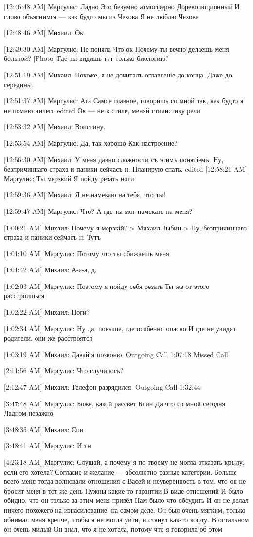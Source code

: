 \documentclass{article}
\newcommand{\yat}{{\fontencoding{X2}\selectfont\cyryat}} %
\begin{document}
{[12:46:48 AM] Маргулис:
Ладно
 Это безумно атмосферно
 Дореволюционный
 И слово объяснимся — как будто мы из Чехова
 Я не люблю Чехова

[12:48:46 AM] Михаил:
Ок

[12:49:30 AM] Маргулис:
Не поняла
 Что ок
 Почему ты вечно делаешь меня больной?
 [Photo]
 Где ты видишь тут только биологию?

[12:51:19 AM] Михаил:
Похоже, я не дочиталъ оглавленіе до конца.
 Даже до середины.

[12:51:37 AM] Маргулис:
Ага
 Самое главное, говоришь со мной так, как будто я не помню ничего
edited 
Ок — не в стиле, меняй стилистику речи

[12:53:32 AM] Михаил:
Воистину.

[12:53:54 AM] Маргулис:
Да, так хорошо
 Как настроение?

[12:56:30 AM] Михаил:
У меня давно сложности съ этимъ понятіемъ.
 Ну, безпричиннаго страха и паники сейчасъ н.
 Планирую спать.
edited 
[12:58:21 AM] Маргулис:
Ты мерзкий
 Я пойду резать ноги

[12:59:36 AM] Михаил:
Я не намекаю на тебя, что ты!

[12:59:47 AM] Маргулис:
Что?
 А где ты мог намекать на меня?

[1:00:21 AM] Михаил:
Почему я мерзкій?
> Михаил Зыбин
> Ну, безпричиннаго страха и паники сейчасъ н.
Тутъ

[1:01:10 AM] Маргулис:
Потому что ты обижаешь меня

[1:01:42 AM] Михаил:
А-а-а, д.

[1:02:03 AM] Маргулис:
Поэтому я пойду себя резать
 Ты же от этого расстроишься

[1:02:22 AM] Михаил:
Ноги?

[1:02:34 AM] Маргулис:
Ну да, повыше, где особенно опасно
 И где не увидят родители, они же расстроятся

[1:03:19 AM] Михаил:
Давай я позвоню.
Outgoing Call 1:07:18
Missed Call

[2:11:56 AM] Маргулис:
Что случилось?

[2:12:47 AM] Михаил:
Телефон разрядился.
Outgoing Call 1:32:44

[3:47:48 AM] Маргулис:
Боже, какой рассвет
 Блин
 Да что со мной сегодня
 Ладном неважно

[3:48:35 AM] Михаил:
Спи

[3:48:41 AM] Маргулис:
И ты

[4:23:18 AM] Маргулис:
Слушай, а почему я по-твоему не могла отказать крылу, если его хотела? Согласие и желание — абсолютно разные категории.
 Больше всего меня тогда волновали отношения с Васей и неуверенность в том, что он не бросит меня в тот же день
 Нужны какие-то гарантии
 В виде отношений
 И было обидно, что он только за этим меня привёл
 Нам было что обсудить
 И он не делал ничего похожего на изнасилование, на самом деле. Он был очень мягким, только обнимал меня крепче, чтобы я не могла уйти, и стянул как-то кофту. В остальном он очень милый
 Он знал, что я не хотела, потому что я говорила об этом

}
\end{document}

